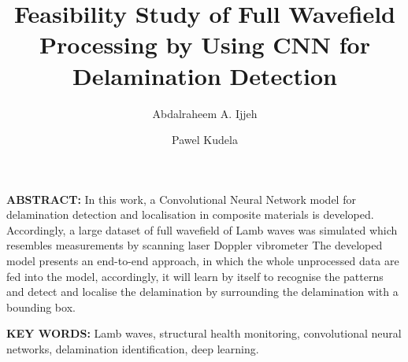 \documentclass[10pt, twocolumn]{article} %
\title{\textbf{Feasibility Study of Full Wavefield Processing by
	Using CNN for Delamination Detection}}
\author[$1$]{Abdalraheem A. Ijjeh}
\author[$1$]{Pawel Kudela}
\affil[$1$]{Institute of Fluid Flow Machinery, Polish Academy of Sciences, Poland}
\date{\vspace{-5ex}}
\begin{document}
	\maketitle

	\begin{flushleft}
		\justify
		\textbf{ABSTRACT:} In this work, a Convolutional Neural Network model for delamination detection and localisation in composite materials is developed.
		Accordingly, a large dataset of full wavefield of Lamb waves was simulated which resembles measurements by scanning laser Doppler vibrometer
		The developed model presents an end-to-end approach, in which the whole unprocessed data are fed into the model, accordingly, it will learn by itself to recognise the patterns and detect and localise the delamination by surrounding the delamination with a bounding box.	  
	\end{flushleft}
	
	\begin{flushleft}
		\justify
		\textbf{KEY WORDS:}	Lamb waves, structural health monitoring, convolutional neural networks, delamination identification, deep learning.  
	\end{flushleft}
\end{document}
